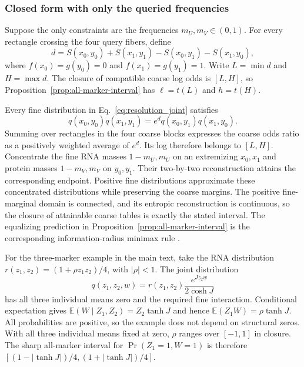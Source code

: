 \subsubsection{Closed form with only the queried frequencies}
Suppose the only constraints are the frequencies
$m_U,m_V\in(0,1)$. For every rectangle crossing the four query fibers, define
\[
 d=S(x_0,y_0)+S(x_1,y_1)-S(x_0,y_1)-S(x_1,y_0),
\]
where $f(x_0)=g(y_0)=0$ and $f(x_1)=g(y_1)=1$. Write $L=\min d$ and
$H=\max d$. The closure of compatible coarse log odds is $[L,H]$, so
Proposition~\ref{prop:all-marker-interval} has
$\ell=t(L)$ and $h=t(H)$.

Every fine distribution in Eq.~\eqref{eq:resolution_joint} satisfies
\[
 q(x_0,y_0)q(x_1,y_1)=e^d q(x_0,y_1)q(x_1,y_0).
\]
Summing over rectangles in the four coarse blocks expresses the coarse odds
ratio as a positively weighted average of $e^d$. Its log therefore belongs to
$[L,H]$. Concentrate the fine RNA masses $1-m_U,m_U$ on an extremizing $x_0,x_1$
and protein masses $1-m_V,m_V$ on $y_0,y_1$. Their two-by-two reconstruction attains
the corresponding endpoint. Positive fine distributions approximate these
concentrated distributions while preserving the coarse margins. The positive
fine-marginal domain is connected, and its entropic reconstruction is
continuous, so the closure of attainable coarse tables is exactly the stated
interval. The equalizing prediction in
Proposition~\ref{prop:all-marker-interval} is the corresponding
information-radius minimax rule \cite{vanerven}.

For the three-marker example in the main text, take the RNA distribution
$r(z_1,z_2)=(1+\rho z_1z_2)/4$, with $|\rho|<1$. The joint distribution
\[
 q(z_1,z_2,w)=r(z_1,z_2)\frac{e^{Jz_2w}}{2\cosh J}
\]
has all three individual means zero and the required fine interaction.
Conditional expectation gives
$\mathbb E(W\mid Z_1,Z_2)=Z_2\tanh J$ and hence
$\mathbb E(Z_1W)=\rho\tanh J$. All probabilities are positive, so the example does
not depend on structural zeros. With all three individual means fixed at zero,
$\rho$ ranges over $[-1,1]$ in closure. The sharp all-marker interval for
$\Pr(Z_1=1,W=1)$ is therefore
$[(1-|\tanh J|)/4,(1+|\tanh J|)/4]$.

